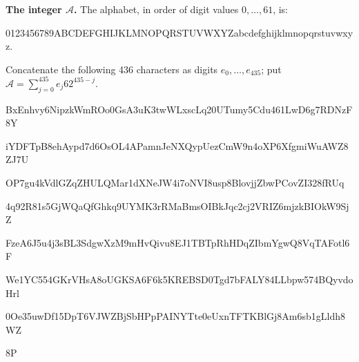 \textbf{The integer $\mathcal A$.}
The alphabet, in order of digit values $0,\ldots,61$, is:\par
{\fontsize{7.7}{8.2}\selectfont\ttfamily 0123456789ABCDEFGHIJKLMNOPQRSTUVWXYZabcdefghijklmnopqrstuvwxyz}.\par
Concatenate the following 436 characters as digits $e_0,\ldots,e_{435}$;
put $\mathcal A=\sum_{j=0}^{435}e_j62^{435-j}$.\par
\begingroup\fontsize{7.7}{8.2}\selectfont\ttfamily
BxEnhvy6NipzkWmROo0GsA3uK3twWLxscLq20UTumy5Cdu461LwD6g7RDNzF8Y\par
iYDFTpB8ehAypd7d6OsOL4APamnJeNXQypUezCmW9n4oXP6XfgmiWuAWZ8ZJ7U\par
OP7gu4kVdlGZqZHULQMar1dXNeJW4i7oNVI8usp8BlovjjZbwPCovZI328fRUq\par
4q92R81s5GjWQaQfGhkq9UYMK3rRMaBmsOIBkJqc2cj2VRIZ6mjzkBIOkW9SjZ\par
FzeA6J5u4j3sBL3SdgwXzM9mHvQivu8EJ1TBTpRhHDqZIbmYgwQ8VqTAFotl6F\par
We1YC554GKrVHsA8oUGKSA6F6k5KREBSD0Tgd7bFALY84LLbpw574BQyvdoHrl\par
0Oe35uwDf15DpT6VJWZBjSbHPpPAINYTte0eUxnTFTKBlGj8Am6sb1gLldh8WZ\par
8P\par
\endgroup

\endgroup
